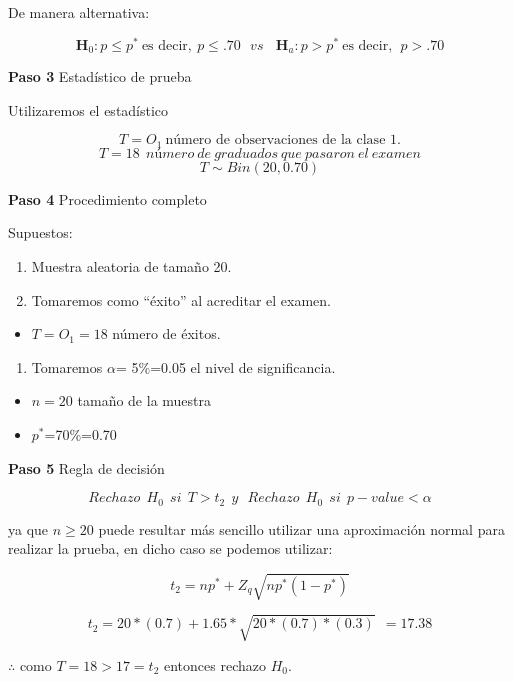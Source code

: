 \documentclass[
  a4paper,
  oneside,
  openany]{book}
\providecommand{\tightlist}{%
  \setlength{\itemsep}{0pt}\setlength{\parskip}{0pt}}
\begin{document}
De manera alternativa:

\[\textbf{H}_{0}: p  \leq p^* \ \mbox{es decir},  \ p  \leq .70\ \ \  vs \ \ \ \ \textbf{H}_{a}: p >p^* \ \mbox{es decir}, \ \ p > .70\]

\textbf{Paso 3} Estadístico de prueba

Utilizaremos el estadístico

\[T=O_{1} \ \mbox{número  de  observaciones  de  la clase 1.}\]
\[T=18 \ \ número\ de\ graduados\ que\ pasaron\ el\ examen\]
\[T\sim Bin(20,0.70)\]

\textbf{Paso 4} Procedimiento completo

Supuestos:

\begin{enumerate}
\def\labelenumi{\arabic{enumi}.}
\item
  Muestra aleatoria de tamaño 20.
\item
  Tomaremos como ``éxito'' al acreditar el examen.
\end{enumerate}

\begin{itemize}
\tightlist
\item
  \(T=O_{1}=18\) número de éxitos.
\end{itemize}

\begin{enumerate}
\def\labelenumi{\arabic{enumi}.}
\setcounter{enumi}{2}
\tightlist
\item
  Tomaremos \(\alpha\)= 5\%=0.05 el nivel de significancia.
\end{enumerate}

\begin{itemize}
\item
  \(n=20\) tamaño de la muestra
\item
  \(p^*\)=70\%=0.70
\end{itemize}

\textbf{Paso 5} Regla de decisión

\[Rechazo \ \  H_0 \ \  si \ \ T>t_{2} \ \  y \ \ \  Rechazo \ \  H_0 \ \ si \ \  p-value<\alpha\]

ya que \(n \geq 20\) puede resultar más sencillo utilizar una aproximación normal para realizar la prueba, en dicho caso se podemos utilizar:

\[t_{2}=np^*+Z_{q}\sqrt{np^*(1-p^*)}\]

\[t_{2}=20*(0.7)+1.65*\sqrt{20*(0.7)*(0.3)} \ \ = 17.38\]

\(\therefore\) como \(T=18>17=t_{2}\) entonces rechazo \(H_0\).
\end{document}
